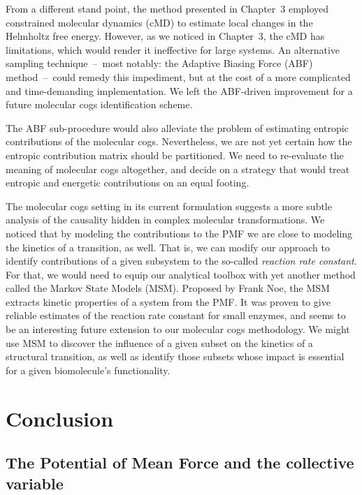 \documentclass[a4paper,11pt,twoside]{book}%
\begin{document}
From a different stand point, the method presented in Chapter~3 employed constrained molecular dynamics (cMD) to estimate local changes in the Helmholtz free energy.
However, as we noticed in Chapter~3, the cMD has limitations, which would render it ineffective for large systems.
An alternative sampling technique~--~most notably: the Adaptive Biasing Force (ABF) method~--~could remedy this impediment, but at the cost of a more complicated and time-demanding implementation.
We left the ABF-driven improvement for a future molecular cogs identification scheme.

The ABF sub-procedure would also alleviate the problem of estimating entropic contributions of the molecular cogs.
Nevertheless, we are not yet certain how the entropic contribution matrix should be partitioned.
We need to re-evaluate the meaning of molecular cogs altogether, and decide on a strategy that would treat entropic and energetic contributions on an equal footing.

The molecular cogs setting in its current formulation suggests a more subtle analysis of the causality hidden in complex molecular transformations.
We noticed that by modeling the contributions to the PMF we are close to modeling the kinetics of a transition, as well.
That is, we can modify our approach to identify contributions of a given subsystem to the so-called \emph{reaction rate constant}.
For that, we would need to equip our analytical toolbox with yet another method called the Markov State Models (MSM).
Proposed by Frank Noe, the MSM extracts kinetic properties of a system from the PMF.
It was proven to give reliable estimates of the reaction rate constant for small enzymes, and seems to be an interesting future extension to our molecular cogs methodology.
We might use MSM to discover the influence of a given subset on the kinetics of a structural transition, as well as identify those subsets whose impact is essential for a given biomolecule's functionality.

\section{Conclusion}

\subsection{The Potential of Mean Force and the collective variable}

\end{document}
